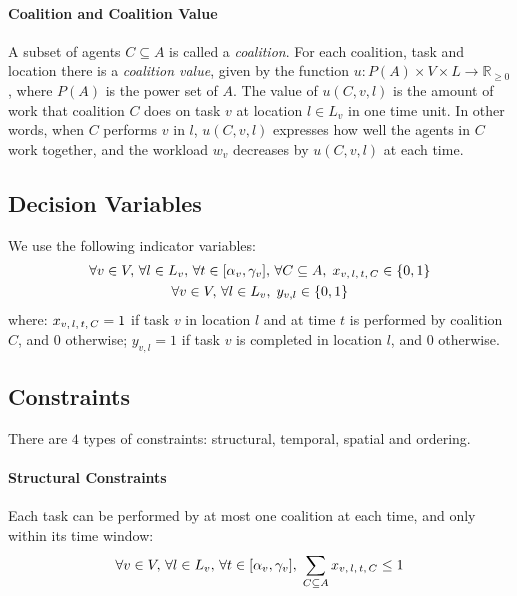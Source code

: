 \paragraph{Coalition and Coalition Value}\label{sec:marsc-cv}

A subset of agents $C \subseteq A$ is called a \emph{coalition}. For each coalition, task
and location there is a \emph{coalition value}, given by the function $u : P(A) \times V
\times L \rightarrow \mathbb{R}_{\geq 0}$, where $P(A)$ is the power set of $A$. The
value of $u(C, v, l)$ is the amount of work that coalition $C$ does on task $v$ at
location $l \in L_v$ in one time unit. In other words, when $C$ performs $v$ in $l$,
$u(C, v, l)$ expresses how well the agents in $C$ work together, and the workload $w_v$
decreases by $u(C, v, l)$ at each time.

\subsection{Decision Variables}\label{sec:marsc-ca}

We use the following indicator variables:
\begin{gather}
    \forall v \in V,\, \forall l \in L_v,\, \forall t \in [\alpha_v,
    \gamma_v],\,
    \forall C \subseteq A,\;
    x_{v,\, l,\, t,\, C} \in \left\{ 0, 1 \right\}\label{eq:mbip0}\\
    \forall v \in V,\, \forall l \in L_v,\; y_{v, l} \in \left\{ 0, 1 \right\}\label{eq:mbip0b}
\end{gather}
where: $x_{v,\, l,\, t,\, C} = 1$ if task $v$ in location $l$ and at time $t$ is performed by coalition
$C$, and $0$ otherwise; $y_{v, l} = 1$ if task $v$ is completed in location $l$, and $0$
otherwise.

\subsection{Constraints}\label{sec:marsc-constraints}

There are $4$ types of constraints: structural, temporal, spatial and ordering.

\paragraph{Structural Constraints}

Each task can be performed by at most one coalition at each time, and only within its time
window:
\begin{equation}\label{eq:mbip1}
    \forall v \in V,\, \forall l \in L_v,\, \forall t \in [\alpha_v, \gamma_v],\;
    \sum_{C \subseteq A} x_{v,\, l,\, t,\, C} \leq 1
\end{equation}

